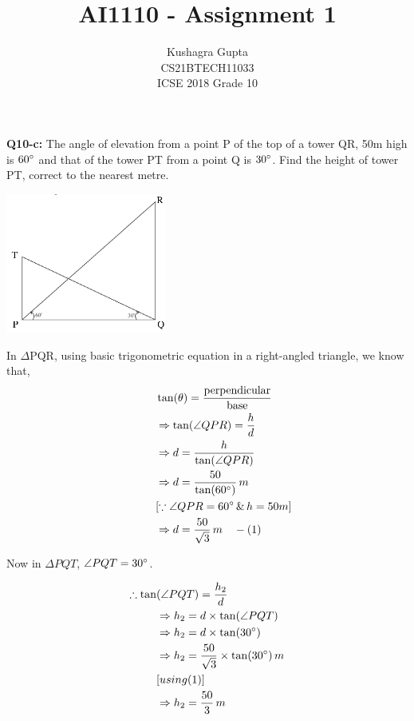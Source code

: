 \documentclass[journal,12pt,twocolumn]{IEEEtran}
\begin{document}
\graphicspath{{figures/}}
\title{AI1110 - Assignment 1}

\author{Kushagra Gupta \\ \normalsize CS21BTECH11033  \\ \Large ICSE 2018 Grade 10}
\date{}
\maketitle
\begin{flushleft}
\textbf{Q10-c:}
The angle of elevation from a point P of the top of a tower QR, 50m high is $60\degree$ and that of the
tower PT from a point Q is $30\degree$. Find the height of tower PT, correct to the nearest metre.

\begin{center}
\includegraphics[width=150pt]{figure.png}
\end{center}
\begin{table}[ht!]
    
    \caption{}
	\label{table:table1}
\end{table}
\solution In $\Delta$PQR, using basic trigonometric equation in a right-angled triangle, we know that,
\begin{align*}
&\tan(\theta)=\frac{\text{perpendicular}}{\text{base}}\\
\hspace{30pt}&\Rightarrow\tan(\angle QPR) = \frac{h}{d} \\
&\Rightarrow d = \frac{h}{\tan(\angle QPR)} \\
&\Rightarrow d = \frac{50}{\tan(60\degree)}\, m \\
&[\because \angle QPR = 60\degree \, \& \, h = 50m] \\
&\Rightarrow d = \frac{50}{\sqrt{3}}\, m \hspace{10pt}-(1) \\
\end{align*} 

Now in $\Delta PQT$, $\angle PQT = 30\degree$.

\begin{align*}
\therefore \tan&(\angle PQT) = \frac{h_2}{d} \\
&\Rightarrow h_2 = d \times \tan(\angle PQT)\\
&\Rightarrow h_2 = d \times \tan(30 \degree)\\
&\Rightarrow h_2 = \frac{50}{\sqrt{3}} \times \tan(30 \degree) \, m \\
&[using (1)]\\
&\Rightarrow h_2 = \frac{50}{3}\, m
\end{align*}


\end{flushleft}
\end{document}
